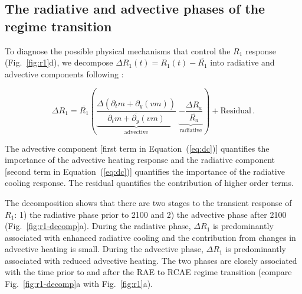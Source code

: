 \documentclass[draft]{agujournal2019}
\begin{document}
\subsection{The radiative and advective phases of the regime transition}
\label{sec:dc}

To diagnose the possible physical mechanisms that control the $R_1$ response (Fig.~\ref{fig:r1}d), we decompose $\Delta R_1(t) = R_1(t) - \overline{R_1}$ into radiative and advective components following :

\begin{equation} \label{eq:dc}
    \Delta R_1 = \overline{R_1}\left( \underbrace{ \frac{\Delta(\partial_t m + \partial_y (vm))}{\overline{\partial_t m + \partial_y (vm)}} }_{\mathrm{advective}} \; \underbrace{ - \frac{\Delta R_a }{\overline{R_a}} }_{\mathrm{radiative}} \right) + \mathrm{Residual} \, .
\end{equation}

The advective component [first term in Equation~(\ref{eq:dc})] quantifies the importance of the advective heating response and the radiative component [second term in Equation~(\ref{eq:dc})] quantifies the importance of the radiative cooling response. The residual quantifies the contribution of higher order terms.

The decomposition shows that there are two stages to the transient response of $R_1$: 1) the radiative phase prior to 2100 and 2) the advective phase after 2100 (Fig.~\ref{fig:r1-decomp}a). During the radiative phase, $\Delta{R_1}$ is predominantly associated with enhanced radiative cooling and the contribution from changes in advective heating is small. During the advective phase, $\Delta{R_1}$ is predominantly associated with reduced advective heating. The two phases are closely associated with the time prior to and after the RAE to RCAE regime transition (compare Fig.~\ref{fig:r1-decomp}a with Fig.~\ref{fig:r1}a). 

\end{document}
